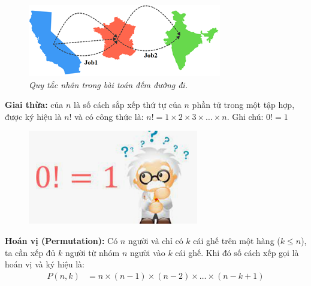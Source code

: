 \begin{multicols}{2}
	\begin{figure}[H]
		\centering
		\vspace*{-5pt}
		\captionsetup{labelformat=empty, justification=centering}
		\includegraphics[width=1\linewidth]{_2}
		\caption{\small\textit{\color{toancuabi}Quy tắc nhân trong bài toán đếm đường đi.}}
		\vspace*{-10pt}
	\end{figure}
	\textbf{\color{toancuabi}Giai thừa:} của $n$ là số cách sắp xếp thứ tự của $n$ phần tử trong một tập hợp, được ký hiệu là $n!$ và có công thức là: $n!=1\times 2\times 3\times \ldots\times n $.
	\vskip 0.1cm
	Ghi chú: $0!=1$
	\begin{figure}[H]
		\centering
		\vspace*{-5pt}
		\captionsetup{labelformat=empty, justification=centering}
		\includegraphics[width=1\linewidth]{_3}
		\vspace*{-15pt}
	\end{figure}
	\vskip 0.1cm
	\textbf{\color{toancuabi}Hoán vị (Permutation):} Có $n$ người và chỉ có $k$ cái ghế trên một hàng ($k\le n$), ta cần xếp đủ $k$ người từ nhóm $n$ người vào $k$ cái ghế. Khi đó số cách xếp gọi là hoán vị và ký hiệu là:
	\begin{align*}
		P(n,k)&=n\!\times\!(n\!-\!1)\!\!\times\!\!(n\!-\!2)\!\!\times\!\!\ldots\!\!\times\!\!(n\!-\!k\!+\!1\!)\\

\end{align*}
\end{multicols}
